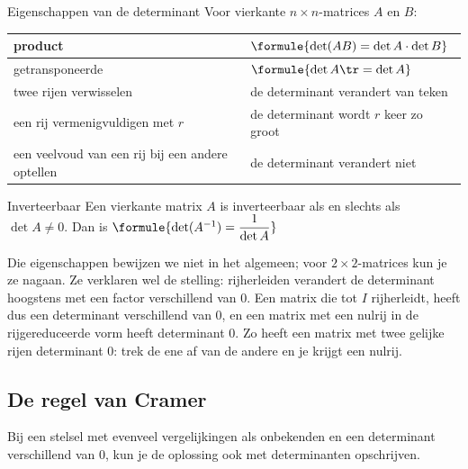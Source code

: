 \begin{theorie}
\begin{stelling}{Eigenschappen van de determinant}
Voor vierkante $n \times n$-matrices $A$ en $B$:

\vspace{1mm}
{\centering{}\renewcommand{\arraystretch}{1.5}%
\begin{tabular}{|>{\centering\arraybackslash}m{6.4cm}|>{\centering\arraybackslash}m{5.6cm}|}
\hline
product & $\formule{\det(AB) = \det A \cdot \det B}$ \\ \hline
getransponeerde & $\formule{\det A\tr = \det A}$ \\ \hline
twee rijen verwisselen & de determinant verandert van teken \\ \hline
een rij vermenigvuldigen met $r$ & de determinant wordt $r$ keer zo groot \\ \hline
een veelvoud van een rij bij een andere optellen & de determinant verandert niet \\ \hline
\end{tabular}\par}
\end{stelling}

\begin{stelling}{Inverteerbaar}
Een vierkante matrix $A$ is inverteerbaar als en slechts als $\det A \neq 0$. Dan is \quad $\formule{\det(A^{-1}) = \dfrac{1}{\det A}}$
\end{stelling}
\end{theorie}

Die eigenschappen bewijzen we niet in het algemeen; voor $2 \times 2$-matrices kun je ze nagaan. Ze verklaren wel de stelling: rijherleiden verandert de determinant hoogstens met een factor verschillend van 0. Een matrix die tot $I$ rijherleidt, heeft dus een determinant verschillend van 0, en een matrix met een nulrij in de rijgereduceerde vorm heeft determinant 0. Zo heeft een matrix met twee gelijke rijen determinant 0: trek de ene af van de andere en je krijgt een nulrij.

\begin{oefeningen}
\end{oefeningen}

\subsection{De regel van Cramer}

Bij een stelsel met evenveel vergelijkingen als onbekenden en een determinant verschillend van 0, kun je de oplossing ook met determinanten opschrijven.


